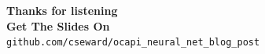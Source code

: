 \documentclass[english,a4,aspectratio=169]{beamer}
\begin{document}
\logo{}
\begin{frame}
  \begin{center}
    \Huge\textbf{Thanks for listening}\\[1cm]
    \Huge\textbf{Get The Slides On\\}
    \LARGE\texttt{github.com/cseward/ocapi\_neural\_net\_blog\_post}
  \end{center}
  \vspace{5cm}
\end{frame}
\end{document}
